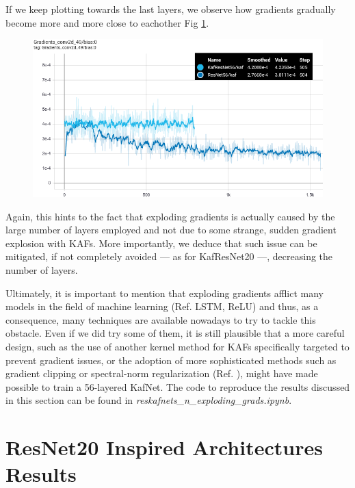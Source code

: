 \documentclass[LaM,binding=0.6cm]{./packages/sapthesis/sapthesis}
\begin{document}
        If we keep plotting towards the last layers, we observe how gradients gradually become more and more close to eachother Fig \ref{fig:gradconv49}.
        \begin{figure}[h!]
            \centering
            \includegraphics[scale=0.38]{gradconv45.png}
            \caption{}
            \label{fig:gradconv49}
        \end{figure}
        Again, this hints to the fact that exploding gradients is actually caused by the large number of layers employed and not due to some strange, sudden gradient explosion with KAFs.
        More importantly, we deduce that such issue can be mitigated, if not completely avoided — as for KafResNet20 —, decreasing the number of layers.
        
        Ultimately, it is important to mention that exploding gradients afflict many models in the field of machine learning (Ref. LSTM, ReLU) and thus, as a consequence, many techniques are available nowadays to try to tackle this obstacle. 
        Even if we did try some of them, it is still plausible that a more careful design, such as the use of another kernel method for KAFs specifically targeted to prevent gradient issues, or the adoption of more 
        sophisticated methods such as gradient clipping or spectral-norm regularization (Ref. ), might have made possible to train a 56-layered KafNet.  
        The code to reproduce the results discussed in this section can be found in \textit{reskafnets\_n\_exploding\_grads.ipynb}.
    \section{ResNet20 Inspired Architectures Results}
\end{document}
